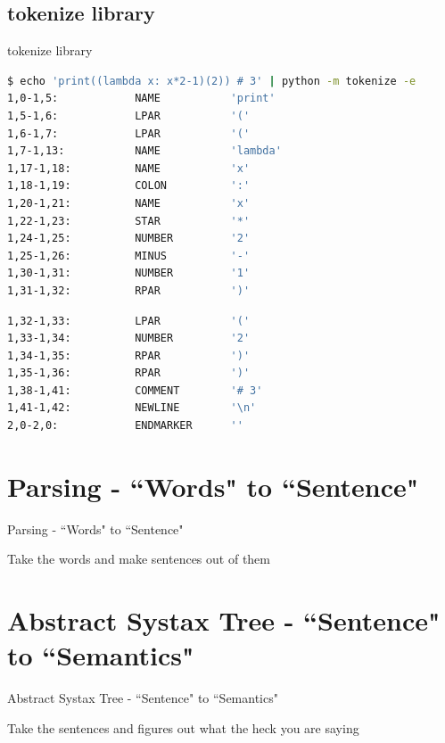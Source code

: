 \documentclass[aspectratio=169, dvipsnames, svgnames, x11names]{beamer}
\begin{document}
\subsection{{\ttfamily tokenize} library}

\begin{frame}[fragile]{{\ttfamily tokenize} library}
\begin{lstlisting}[language=bash, numbers=none]
$ echo 'print((lambda x: x*2-1)(2)) # 3' | python -m tokenize -e
1,0-1,5:            NAME           'print'        
1,5-1,6:            LPAR           '('            
1,6-1,7:            LPAR           '('            
1,7-1,13:           NAME           'lambda'       
1,17-1,18:          NAME           'x'            
1,18-1,19:          COLON          ':'            
1,20-1,21:          NAME           'x'            
1,22-1,23:          STAR           '*'            
1,24-1,25:          NUMBER         '2'            
1,25-1,26:          MINUS          '-'            
1,30-1,31:          NUMBER         '1'            
1,31-1,32:          RPAR           ')'            
\end{lstlisting}
\end{frame}

\begin{frame}[fragile]
\begin{lstlisting}[language=bash, numbers=none]
1,32-1,33:          LPAR           '('            
1,33-1,34:          NUMBER         '2'            
1,34-1,35:          RPAR           ')'            
1,35-1,36:          RPAR           ')'            
1,38-1,41:          COMMENT        '# 3'          
1,41-1,42:          NEWLINE        '\n'           
2,0-2,0:            ENDMARKER      ''   
\end{lstlisting}
\end{frame}
\section{Parsing - ``Words" to ``Sentence"}
\begin{frame}{Parsing - ``Words" to ``Sentence"}
\begin{itemize}
{\LARGE \item[-] Take the words and make sentences out of them}
\end{itemize}
\end{frame}

\section{Abstract Systax Tree - ``Sentence" to ``Semantics"}
\begin{frame}{Abstract Systax Tree - ``Sentence" to ``Semantics"}
\begin{itemize}
{\LARGE \item[-] Take the sentences and figures out what the heck you are saying}
\end{itemize}
\end{frame}
\end{document}
